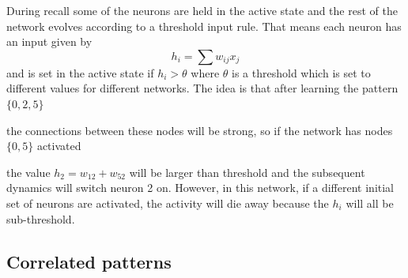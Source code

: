\documentclass[11pt,a4paper]{scrartcl}
\begin{document}
During recall some of the neurons are held in the active state and the
rest of the network evolves according to a threshold input rule. That
means each neuron has an input given by
\begin{equation}
h_i=\sum{w_{ij}x_j}
\end{equation}
and is set in the active state if $h_i>\theta$ where $\theta$ is a
threshold which is set to different values for different networks. The idea is that after learning the pattern $\{0,2,5\}$ 
\begin{center}
\end{center}
the connections between these nodes will be strong, so if the network has nodes $\{0,5\}$ activated
\begin{center}
\end{center}
the value $h_{2}=w_{12}+w_{52}$ will be larger than threshold and the
subsequent dynamics will switch neuron 2 on. However, in this network,
if a different initial set of neurons are activated, the activity will
die away because the $h_i$ will all be sub-threshold.

\subsection*{Correlated patterns}
\end{document}
